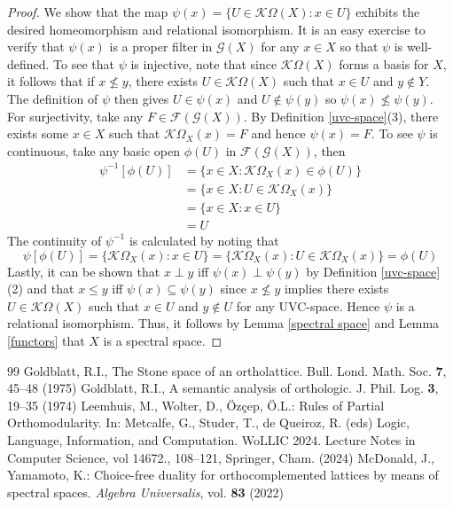 \documentclass[10pt,a4paper]{amsart}
\begin{document}
\begin{proof}
    We show that the map $\psi(x)=\{U\in\mathcal{K}\Omega(X):x\in U\}$ exhibits the desired homeomorphism and relational isomorphism. It is an easy exercise to verify that $\psi(x)$ is a proper filter in $\mathcal{G}(X)$ for any $x\in X$ so that $\psi$ is well-defined. To see that $\psi$ is injective, note that since $\mathcal{K}\Omega(X)$ forms a basis for $X$, it follows that if $x\not\leqslant y$, there exists $U\in\mathcal{K}\Omega(X)$ such that $x\in U$ and $y\not\in Y$. The definition of $\psi$ then gives $U\in\psi(x)$ and $U\not\in\psi(y)$ so $\psi(x)\not\leqslant\psi(y)$. For surjectivity, take any $F\in\mathcal{F}(\mathcal{G}(X))$. By Definition \ref{uvc-space}(3), there exists some $x\in X$ such that $\mathcal{K}\Omega_X(x)=F$ and hence $\psi(x)=F$. To see $\psi$ is continuous, take any basic open $\phi(U)$ in $\mathcal{F}(\mathcal{G}(X))$, then 
    \begin{align*}
        \psi^{-1}[\phi(U)]&=\{x\in X:\mathcal{K}\Omega_X(x)\in\phi(U)\}\\&=\{x\in X:U\in\mathcal{K}\Omega_X(x)\}\\&=\{x\in X:x\in U\}\\&=U
    \end{align*}
   The continuity of $\psi^{-1}$ is calculated by noting that 
 \[
       \psi[\phi(U)]=\{\mathcal{K}\Omega_X(x):x\in U\}=\{\mathcal{K}\Omega_X(x):U\in\mathcal{K}\Omega_X(x)\}=\phi(U)
\]
 Lastly, it can be shown that $x\perp y$ iff $\psi(x)\perp\psi(y)$ by Definition \ref{uvc-space}(2) and that $x\leqslant y$ iff $\psi(x)\subseteq\psi(y)$ since $x\not\leqslant y$ implies there exists $U\in\mathcal{K}\Omega(X)$ such that $x\in U$ and $y\not\in U$ for any UVC-space. Hence $\psi$ is a relational isomorphism. Thus, it follows by Lemma \ref{spectral space} and Lemma \ref{functors} that $X$ is a spectral space.     
\end{proof}
 

\begin{thebibliography}{99}
 Goldblatt, R.I., The Stone space of an ortholattice. Bull. Lond. Math. Soc. \textbf{7}, 45--48 (1975)
 Goldblatt, R.I., A semantic analysis of orthologic. J. Phil. Log. \textbf{3}, 19--35 (1974)
 Leemhuis, M., Wolter, D., Özçep, Ö.L.: Rules of Partial Orthomodularity. In: Metcalfe, G., Studer, T., de Queiroz, R. (eds) Logic, Language, Information, and Computation. WoLLIC 2024. Lecture Notes in Computer Science, vol 14672., 108--121, Springer, Cham. (2024)
 McDonald, J., Yamamoto, K.: Choice-free duality for orthocomplemented lattices by means of spectral spaces. \emph{Algebra Universalis}, vol. \textbf{83} (2022)
\end{thebibliography}
\end{document}
